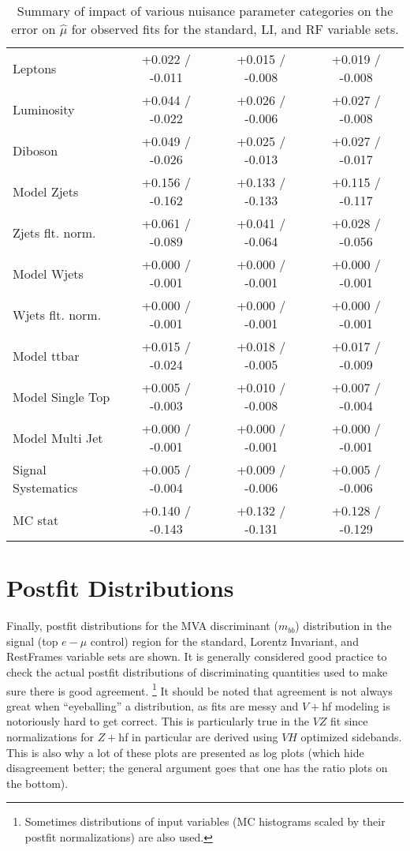 \begin{enumeate}
\begin{table}[!htbp]
\begin{center}
\begin{tabular}{lccc}
Leptons &  +0.022 / -0.011  &  +0.015 / -0.008  &  +0.019 / -0.008 \\
Luminosity &  +0.044 / -0.022  &  +0.026 / -0.006  &  +0.027 / -0.008 \\
Diboson &  +0.049 / -0.026  &  +0.025 / -0.013  &  +0.027 / -0.017 \\
Model Zjets &  +0.156 / -0.162  &  +0.133 / -0.133  &  +0.115 / -0.117 \\
Zjets flt. norm. &  +0.061 / -0.089  &  +0.041 / -0.064  &  +0.028 / -0.056 \\
Model Wjets &  +0.000 / -0.001  &  +0.000 / -0.001  &  +0.000 / -0.001 \\
Wjets flt. norm. &  +0.000 / -0.001  &  +0.000 / -0.001  &  +0.000 / -0.001 \\
Model ttbar &  +0.015 / -0.024  &  +0.018 / -0.005  &  +0.017 / -0.009 \\
Model Single Top &  +0.005 / -0.003  &  +0.010 / -0.008  &  +0.007 / -0.004 \\
Model Multi Jet &  +0.000 / -0.001  &  +0.000 / -0.001  &  +0.000 / -0.001 \\
Signal Systematics &  +0.005 / -0.004  &  +0.009 / -0.006  &  +0.005 / -0.006 \\
MC stat &  +0.140 / -0.143  &  +0.132 / -0.131  &  +0.128 / -0.129 \\
\hline\hline
\end{tabular}
\end{center}
\caption{Summary of impact of various nuisance parameter categories on the error on $\hat{\mu}$ for observed fits for the standard, LI, and RF variable sets.}
\label{tab:obsbdvz}
\end{table}

\clearpage
\section{Postfit Distributions}
Finally, postfit distributions for the MVA discriminant ($m_{bb}$) distribution in the signal (top $e-\mu$ control) region for the standard, Lorentz Invariant, and RestFrames variable sets are shown.  It is generally considered good practice to check the actual postfit distributions of discriminating quantities used to make sure there is good agreement.  \footnote{Sometimes distributions of input variables (MC histograms scaled by their postfit normalizations) are also used.}  It should be noted that agreement is not always great when ``eyeballing'' a distribution, as fits are messy and $V+$hf modeling is notoriously hard to get correct.  This is particularly true in the $VZ$ fit since normalizations for $Z+$hf in particular are derived using $VH$ optimized sidebands.  This is also why a lot of these plots are presented as log plots (which hide disagreement better; the general argument goes that one has the ratio plots on the bottom).


\end{enumeate}
